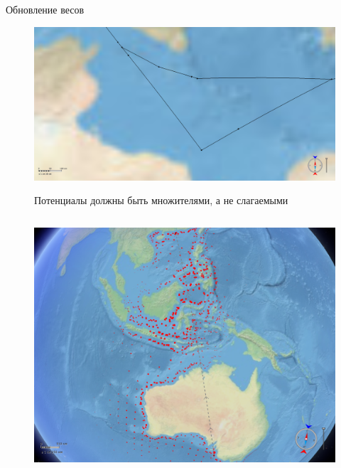 \documentclass[russian, hyperref={unicode}]{beamer}
\theoremstyle{definition}
\begin{document}
\begin{frame}{Обновление весов}
     {
        \begin{figure}
            \includegraphics[width=\textwidth]{potentials-multipliers}

            Потенциалы должны быть множителями, а не слагаемыми
        \end{figure}
    }
 
     {
        \begin{columns}
            \begin{figure}
                \includegraphics[clip=true, trim = 280pt 0 20pt 0, width=\textwidth]{potentials-update/accum1}
            \end{figure}


\end{columns}}
\end{frame}
\end{document}
